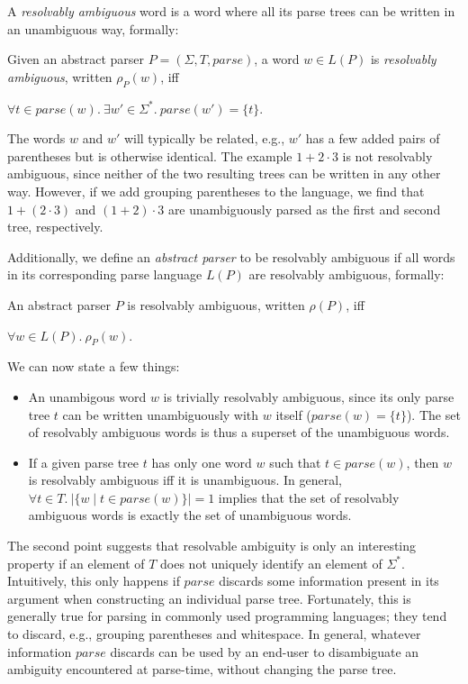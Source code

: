 \documentclass[runningheads]{llncs}
\newcommand{\T}{\Sigma} %
\newcommand{\parse}{\mathit{parse}} %
\begin{document}
\noindent A \emph{resolvably ambiguous} word is a word where all its parse trees can be written in an unambiguous way, formally:

\begin{definition}\label{def:resolvable-word}
  Given an abstract parser $P = (\T, T, \parse)$, a word $w \in L(P)$ is \emph{resolvably ambiguous}, written $\rho_P(w)$, iff

  $\forall t \in \parse(w).\ \exists w' \in \T^{*}.\ \parse(w') = \{t\}$.
\end{definition}

The words $w$ and $w'$ will typically be related, e.g., $w'$ has a few added pairs of parentheses but is otherwise identical.
The example $1 + 2 \cdot 3$
is not resolvably ambiguous, since neither of the two resulting trees can be written in any other way. However, if we add grouping parentheses to the language, we find that $1 + (2 \cdot 3)$ and $(1 + 2) \cdot 3$ are unambiguously parsed as the first and second tree, respectively.

Additionally, we define an \emph{abstract parser} to be resolvably ambiguous if all words in its corresponding parse language $L(P)$ are resolvably ambiguous, formally:

\begin{definition}\label{def:resolvable-language}
  An abstract parser $P$ is resolvably ambiguous, written $\rho(P)$, iff

  $\forall w \in L(P).\ \rho_P(w)$.
\end{definition}

\noindent We can now state a few things:

\begin{itemize}
\item An unambigous word $w$ is trivially resolvably ambiguous, since its only parse tree $t$ can be written unambiguously with $w$ itself ($\parse(w) = \{t\}$). The set of resolvably ambiguous words is thus a superset of the unambiguous words.
\item If a given parse tree $t$ has only one word $w$ such that $t \in \parse(w)$, then $w$ is resolvably ambiguous iff it is unambiguous. In general, $\forall t \in T.\ \lvert\{w \mid t \in \parse(w)\}\rvert = 1$ implies that the set of resolvably ambiguous words is exactly the set of unambiguous words.
\end{itemize}

\noindent The second point suggests that resolvable ambiguity is only an interesting property if an element of $T$ does not uniquely identify an element of $\T^{*}$. Intuitively, this only happens if $\parse$ discards some information present in its argument when constructing an individual parse tree. Fortunately, this is generally true for parsing in commonly used programming languages; they tend to discard, e.g., grouping parentheses and whitespace. In general, whatever information $\parse$ discards can be used by an end-user to disambiguate an ambiguity encountered at parse-time, without changing the parse tree.
\end{document}
